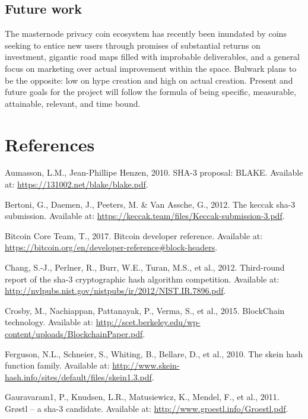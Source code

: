 \documentclass[11pt,a4paperpaper,]{report}
\begin{document}
\section{Future work}\label{future-work}

The masternode privacy coin ecosystem has recently been inundated by
coins seeking to entice new users through promises of substantial
returns on investment, gigantic road maps filled with improbable
deliverables, and a general focus on marketing over actual improvement
within the space. Bulwark plans to be the opposite: low on hype creation
and high on actual creation. Present and future goals for the project
will follow the formula of being specific, measurable, attainable,
relevant, and time bound.

\footnotesize

\chapter*{References}\label{references}

\hypertarget{refs}{}
\hypertarget{ref-Blake}{}
Aumasson, L.M., Jean-Phillipe Henzen, 2010. SHA-3 proposal: BLAKE.
Available at: \url{https://131002.net/blake/blake.pdf}.

\hypertarget{ref-Keccak}{}
Bertoni, G., Daemen, J., Peeters, M. \& Van Assche, G., 2012. The keccak
sha-3 submission. Available at:
\url{https://keccak.team/files/Keccak-submission-3.pdf}.

\hypertarget{ref-Bitcoindev}{}
Bitcoin Core Team, T., 2017. Bitcoin developer reference. Available at:
\url{https://bitcoin.org/en/developer-reference\#block-headers}.

\hypertarget{ref-NIST}{}
Chang, S.-J., Perlner, R., Burr, W.E., Turan, M.S., et al., 2012.
Third-round report of the sha-3 cryptographic hash algorithm
competition. Available at:
\url{http://nvlpubs.nist.gov/nistpubs/ir/2012/NIST.IR.7896.pdf}.

\hypertarget{ref-Crosby}{}
Crosby, M., Nachiappan, Pattanayak, P., Verma, S., et al., 2015.
BlockChain technology. Available at:
\url{http://scet.berkeley.edu/wp-content/uploads/BlockchainPaper.pdf}.

\hypertarget{ref-Skein}{}
Ferguson, N.L., Schneier, S., Whiting, B., Bellare, D., et al., 2010.
The skein hash function family. Available at:
\url{http://www.skein-hash.info/sites/default/files/skein1.3.pdf}.

\hypertarget{ref-Grostl}{}
Gauravaram1, P., Knudsen, L.R., Matusiewicz, K., Mendel, F., et al.,
2011. Grøstl -- a sha-3 candidate. Available at:
\url{http://www.groestl.info/Groestl.pdf}.
\end{document}
